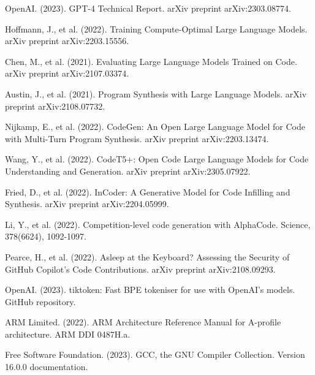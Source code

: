 \documentclass[11pt,a4paper]{article}
\begin{document}
\begin{thebibliography}{12}

OpenAI. (2023). GPT-4 Technical Report. arXiv preprint arXiv:2303.08774.

Hoffmann, J., et al. (2022). Training Compute-Optimal Large Language Models. arXiv preprint arXiv:2203.15556.

Chen, M., et al. (2021). Evaluating Large Language Models Trained on Code. arXiv preprint arXiv:2107.03374.

Austin, J., et al. (2021). Program Synthesis with Large Language Models. arXiv preprint arXiv:2108.07732.

Nijkamp, E., et al. (2022). CodeGen: An Open Large Language Model for Code with Multi-Turn Program Synthesis. arXiv preprint arXiv:2203.13474.

Wang, Y., et al. (2022). CodeT5+: Open Code Large Language Models for Code Understanding and Generation. arXiv preprint arXiv:2305.07922.

Fried, D., et al. (2022). InCoder: A Generative Model for Code Infilling and Synthesis. arXiv preprint arXiv:2204.05999.

Li, Y., et al. (2022). Competition-level code generation with AlphaCode. Science, 378(6624), 1092-1097.

Pearce, H., et al. (2022). Asleep at the Keyboard? Assessing the Security of GitHub Copilot's Code Contributions. arXiv preprint arXiv:2108.09293.

OpenAI. (2023). tiktoken: Fast BPE tokeniser for use with OpenAI's models. GitHub repository.

ARM Limited. (2022). ARM Architecture Reference Manual for A-profile architecture. ARM DDI 0487H.a.

Free Software Foundation. (2023). GCC, the GNU Compiler Collection. Version 16.0.0 documentation.

\end{thebibliography}
\end{document}
